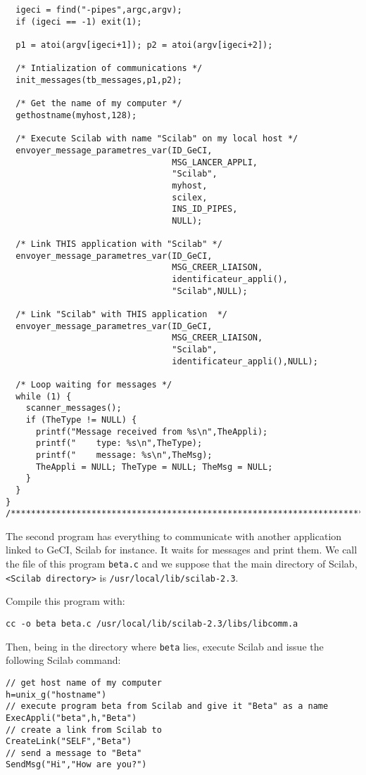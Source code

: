 \documentclass[11pt]{article}
\newcommand{\T}[1]{\texttt{#1}}
\begin{document}
\begin{verbatim}
  igeci = find("-pipes",argc,argv);
  if (igeci == -1) exit(1);

  p1 = atoi(argv[igeci+1]); p2 = atoi(argv[igeci+2]);

  /* Intialization of communications */
  init_messages(tb_messages,p1,p2);

  /* Get the name of my computer */
  gethostname(myhost,128);

  /* Execute Scilab with name "Scilab" on my local host */
  envoyer_message_parametres_var(ID_GeCI,
                                 MSG_LANCER_APPLI,
                                 "Scilab",
                                 myhost,
                                 scilex,
                                 INS_ID_PIPES,
                                 NULL);

  /* Link THIS application with "Scilab" */
  envoyer_message_parametres_var(ID_GeCI,
                                 MSG_CREER_LIAISON, 
                                 identificateur_appli(),
                                 "Scilab",NULL);
  
  /* Link "Scilab" with THIS application  */
  envoyer_message_parametres_var(ID_GeCI,
                                 MSG_CREER_LIAISON, 
                                 "Scilab",
                                 identificateur_appli(),NULL);

  /* Loop waiting for messages */
  while (1) {
    scanner_messages();
    if (TheType != NULL) {
      printf("Message received from %s\n",TheAppli);
      printf("    type: %s\n",TheType);
      printf("    message: %s\n",TheMsg);
      TheAppli = NULL; TheType = NULL; TheMsg = NULL;
    }
  }
}
/***************************************************************************/
\end{verbatim} 

\bigskip
 
The second program has everything to communicate with another
application linked to GeCI, Scilab for instance.
It waits for messages and print them. We call the file of this program 
\T{beta.c}
and we suppose that the main directory of Scilab, 
\verb|<Scilab directory>| is \T{/usr/local/lib/scilab-2.3}.

Compile this program with:
 
\begin{verbatim}
cc -o beta beta.c /usr/local/lib/scilab-2.3/libs/libcomm.a
\end{verbatim}

Then, being in the directory where \T{beta} lies, execute Scilab and
issue the following Scilab command:
\begin{verbatim}
// get host name of my computer
h=unix_g("hostname")
// execute program beta from Scilab and give it "Beta" as a name
ExecAppli("beta",h,"Beta")
// create a link from Scilab to 
CreateLink("SELF","Beta")
// send a message to "Beta"
SendMsg("Hi","How are you?")
\end{verbatim}
\end{document}
